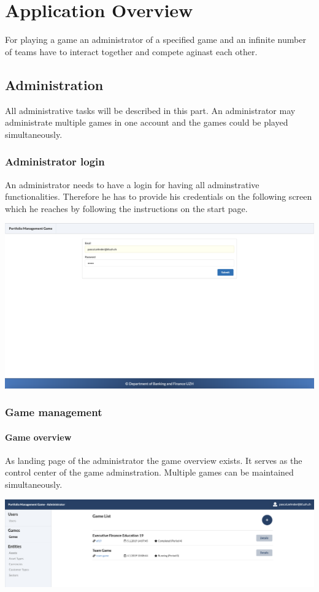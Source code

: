 \section{Application Overview}
For playing a game an administrator of a specified game and an infinite number of teams have to interact together and compete aginast each other.

\subsection{Administration}
All administrative tasks will be described in this part. An administrator may administrate multiple games in one account and the games could be played simultaneously.

\subsubsection{Administrator login}
An administrator needs to have a login for having all adminstrative functionalities. Therefore he has to provide his credentials on the following screen which he reaches by following the instructions on the start page.
\begin{center}
  \includegraphics[scale=0.2]{img/application-overview/administrator/01_login.png}
\end{center}

\subsubsection{Game management}
\paragraph{Game overview}
As landing page of the administrator the game overview exists. It serves as the control center of the game adminstration. Multiple games can be maintained simultaneously.
\begin{center}
  \includegraphics[scale=0.2]{img/application-overview/administrator/02_game_overview.png}
\end{center}

